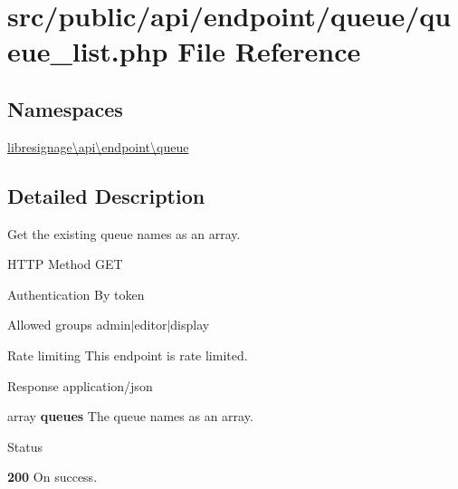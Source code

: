 \hypertarget{src_2public_2api_2endpoint_2queue_2queue__list_8php}{}\section{src/public/api/endpoint/queue/queue\+\_\+list.php File Reference}
\label{src_2public_2api_2endpoint_2queue_2queue__list_8php}
\subsection*{Namespaces}
\begin{DoxyCompactItemize}
\item 
 \hyperlink{namespacelibresignage_1_1api_1_1endpoint_1_1queue}{libresignage\textbackslash{}api\textbackslash{}endpoint\textbackslash{}queue}
\end{DoxyCompactItemize}


\subsection{Detailed Description}
Get the existing queue names as an array.

\begin{DoxyParagraph}{H\+T\+TP Method}
G\+ET 
\end{DoxyParagraph}
\begin{DoxyParagraph}{Authentication}
By token 
\end{DoxyParagraph}
\begin{DoxyParagraph}{Allowed groups}
{\ttfamily admin$\vert$editor$\vert$display} 
\end{DoxyParagraph}
\begin{DoxyParagraph}{Rate limiting}
This endpoint is rate limited.
\end{DoxyParagraph}
\begin{DoxyParagraph}{Response}
application/json
\begin{DoxyItemize}
\item {\ttfamily array} {\bfseries queues} The queue names as an array.
\end{DoxyItemize}
\end{DoxyParagraph}
\begin{DoxyParagraph}{Status}

\begin{DoxyItemize}
\item {\bfseries 200} On success. 
\end{DoxyItemize}
\end{DoxyParagraph}
